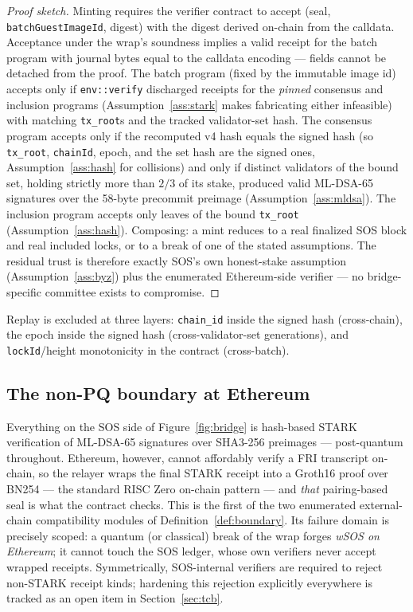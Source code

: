 \documentclass[11pt]{article}
\newcommand{\code}[1]{\texttt{#1}}
\newcommand{\mldsa}{ML\mbox{-}DSA\mbox{-}65}
\newcommand{\sha}{SHA3\mbox{-}256}
\theoremstyle{plain}
\theoremstyle{definition}
\theoremstyle{remark}
\begin{document}
\begin{proof}[Proof sketch]
Minting requires the verifier contract to accept (seal,
\code{batchGuestImageId}, digest) with the digest derived on-chain from the
calldata. Acceptance under the wrap's soundness implies a valid receipt for
the batch program with journal bytes equal to the calldata encoding ---
fields cannot be detached from the proof. The batch program (fixed by the
immutable image id) accepts only if \code{env::verify} discharged receipts
for the \emph{pinned} consensus and inclusion programs
(Assumption~\ref{ass:stark} makes fabricating either infeasible) with
matching \code{tx\_root}s and the tracked validator-set hash. The consensus
program accepts only if the recomputed v4 hash equals the signed hash (so
\code{tx\_root}, \code{chainId}, epoch, and the set hash are the signed
ones, Assumption~\ref{ass:hash} for collisions) and only if distinct
validators of the bound set, holding strictly more than $2/3$ of its stake,
produced valid \mldsa{} signatures over the 58-byte precommit preimage
(Assumption~\ref{ass:mldsa}). The inclusion program accepts only leaves of
the bound \code{tx\_root} (Assumption~\ref{ass:hash}). Composing: a mint
reduces to a real finalized SOS block and real included locks, or to a break
of one of the stated assumptions. The residual trust is therefore exactly
SOS's own honest-stake assumption (Assumption~\ref{ass:byz}) plus the
enumerated Ethereum-side verifier --- no bridge-specific committee exists to
compromise.
\end{proof}

Replay is excluded at three layers: \code{chain\_id} inside the signed hash
(cross-chain), the epoch inside the signed hash (cross-validator-set
generations), and \code{lockId}/height monotonicity in the contract
(cross-batch).

\subsection{The non-PQ boundary at Ethereum}
\label{sec:nonpq}

Everything on the SOS side of Figure~\ref{fig:bridge} is hash-based STARK
verification of \mldsa{} signatures over \sha{} preimages --- post-quantum
throughout. Ethereum, however, cannot affordably verify a FRI transcript
on-chain, so the relayer wraps the final STARK receipt into a Groth16 proof
over BN254 \cite{groth16} --- the standard RISC Zero on-chain pattern ---
and \emph{that} pairing-based seal is what the contract checks. This is the
first of the two enumerated external-chain compatibility modules of
Definition~\ref{def:boundary}. Its failure domain is precisely scoped: a
quantum (or classical) break of the wrap forges \emph{wSOS on Ethereum};
it cannot touch the SOS ledger, whose own verifiers never accept wrapped
receipts. Symmetrically, SOS-internal verifiers are required to reject
non-STARK receipt kinds; hardening this rejection explicitly everywhere is
tracked as an open item in Section~\ref{sec:tcb}.
\end{document}
